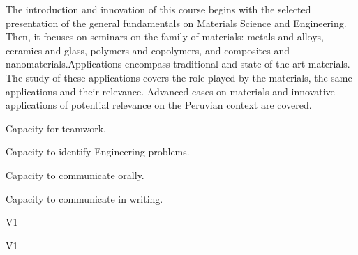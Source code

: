 
\begin{syllabus}


\begin{justification}
The introduction and innovation of this course begins with the selected presentation of the general fundamentals on Materials Science and Engineering.
Then, it focuses on seminars on the family of materials: metals and alloys, ceramics and glass, polymers and copolymers, and composites and nanomaterials.Applications encompass traditional and state-of-the-art materials. 
The study of these applications covers the role played by the materials, the same applications and their relevance. Advanced cases on materials and innovative applications of potential relevance on the Peruvian context are covered.
\end{justification}

\begin{goals}
\item Capacity for teamwork.
\item Capacity to identify Engineering problems.
\item Capacity to communicate orally.
\item Capacity to communicate in writing.
\end{goals}


\begin{outcomes}{V1}
\end{outcomes}

\begin{competences}{V1}
    \item {}
\end{competences}



\end{syllabus}
